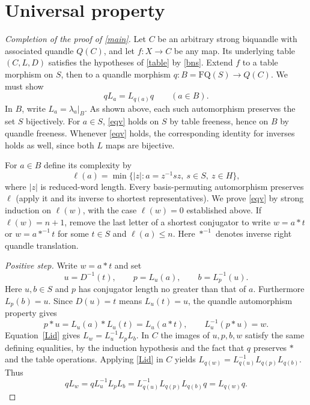 \documentclass[11pt,a4paper]{article}
\newcommand{\FQ}{\mathrm{FQ}}
\begin{document}
\section{Universal property}
\begin{proof}[Completion of the proof of \cref{main}]
Let $C$ be an arbitrary strong biquandle with associated quandle $Q(C)$, and let $f:X\to C$ be any map. Its underlying table $(C,L,D)$ satisfies the hypotheses of \cref{table} by \eqref{bns}. Extend $f$ to a table morphism on $S$, then to a quandle morphism $q:B=\FQ(S)\to Q(C)$. We must show
\begin{equation}\label{eqv}
qL_a=L_{q(a)}q\qquad (a\in B).
\end{equation}
In $B$, write $L_a=\lambda_a|_B$. As shown above, each such automorphism preserves the set $S$ bijectively. For $a\in S$, \eqref{eqv} holds on $S$ by table freeness, hence on $B$ by quandle freeness. Whenever \eqref{eqv} holds, the corresponding identity for inverses holds as well, since both $L$ maps are bijective.

For $a\in B$ define its complexity by
\[
\ell(a)=\min\{|z|:a=z^{-1}sz,\ s\in S,\ z\in H\},
\]
where $|z|$ is reduced-word length. Every basis-permuting automorphism preserves $\ell$ (apply it and its inverse to shortest representatives). We prove \eqref{eqv} by strong induction on $\ell(w)$, with the case $\ell(w)=0$ established above. If $\ell(w)=n+1$, remove the last letter of a shortest conjugator to write $w=a*t$ or $w=a*^{-1}t$ for some $t\in S$ and $\ell(a)\leq n$. Here $*^{-1}$ denotes inverse right quandle translation.

\emph{Positive step.} Write $w=a*t$ and set
\[
u=D^{-1}(t),\qquad p=L_u(a),\qquad b=L_p^{-1}(u).
\]
Here $u,b\in S$ and $p$ has conjugator length no greater than that of $a$. Furthermore $L_p(b)=u$. Since $D(u)=t$ means $L_u(t)=u$, the quandle automorphism property gives
\[
p*u=L_u(a)*L_u(t)=L_u(a*t),\qquad L_u^{-1}(p*u)=w.
\] Equation~\eqref{Lid} gives $L_w=L_u^{-1}L_pL_b$. In $C$ the images of $u,p,b,w$ satisfy the same defining equalities, by the induction hypothesis and the fact that $q$ preserves $*$ and the table operations. Applying \eqref{Lid} in $C$ yields $L_{q(w)}=L_{q(u)}^{-1}L_{q(p)}L_{q(b)}$. Thus
\[
qL_w=qL_u^{-1}L_pL_b
      =L_{q(u)}^{-1}L_{q(p)}L_{q(b)}q=L_{q(w)}q.
\]


\end{proof}
\end{document}
